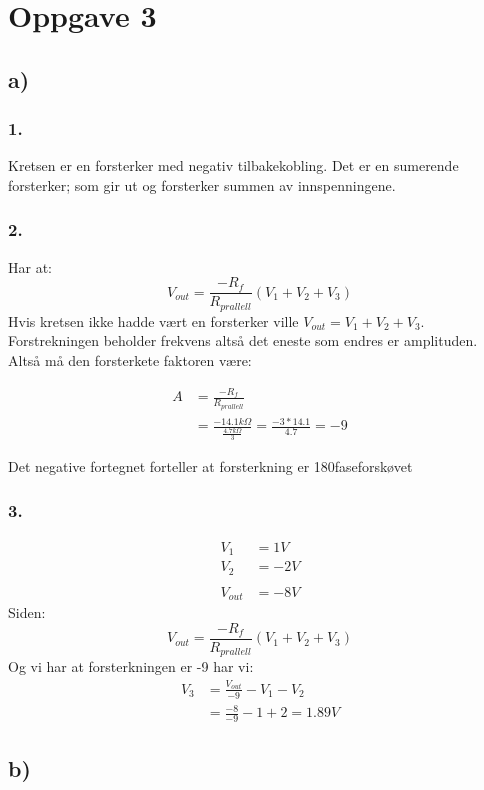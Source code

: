 \documentclass[a4paper, norsk, twoside, 10pt]{article}
\begin{document}
\section*{Oppgave 3}
\subsection*{a)}
\subsubsection*{1.}
Kretsen er en forsterker med negativ tilbakekobling. Det er en sumerende forsterker; som gir ut og forsterker summen av innspenningene. 



\subsubsection*{2.}
Har at:
\[V_{out} = \frac{-R_{f}}{R_{prallell}} (V_{1} + V_{2} + V_{3})\]
Hvis kretsen ikke hadde vært en forsterker ville $V_{out} = V_{1} + V_{2} + V_{3}$. Forstrekningen beholder frekvens altså det eneste som endres er amplituden. Altså må den forsterkete faktoren være:


\begin{align*}
  A &= \frac{-R_{f}}{R_{prallell}} \\
  &= \frac{-14.1k\Omega}{\frac{4.7k\Omega}{3}}  = \frac{-3*14.1}{4.7}  = -9
\end{align*}

Det negative fortegnet forteller at forsterkning er 180\degree faseforskøvet



\subsubsection*{3.}
\begin{align*}
  V_{1} &= 1V \\
  V_{2} &= -2V\\
  \\
  V_{out} &= -8V
\end{align*}
Siden:
\[V_{out} = \frac{-R_{f}}{R_{prallell}} (V_{1} + V_{2} + V_{3})\]
Og vi har at forsterkningen er -9 har vi:
\begin{align*}
  V_{3} &= \frac{V_{out}}{-9}- V_{1} - V_{2} \\
  &= \frac{-8}{-9}- 1 + 2 = 1.89 V
\end{align*}


\subsection*{b)}
\end{document}

